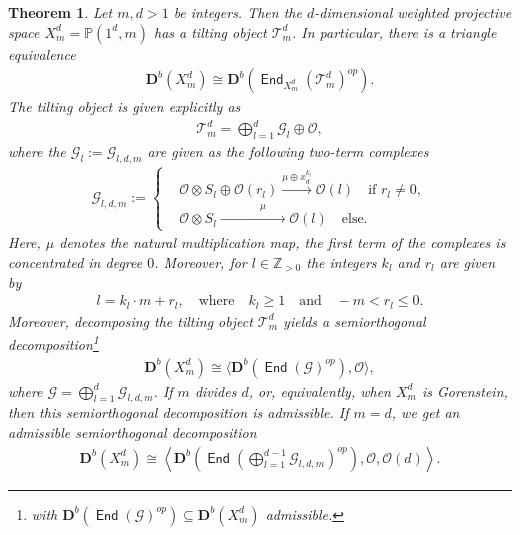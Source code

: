 \documentclass[a4paper,11pt, reqno]{amsart}
\def\P{\mathbb P}
\def\Z{\mathbb Z}
\def\DD{\mathbf D}
\def\OO{\mathcal O}
\def\sG{\mathscr{G}}
\def\sT{\mathscr{T}}
\newcommand{\opname}[1]{\operatorname{\mathsf{#1}}}
\newcommand{\End}{\opname{End}}
\newcommand{\op}{^{op}}
\def\Db{\DD^b}
\theoremstyle{plain}
\newtheorem{theorem}[dummy]{Theorem}
\theoremstyle{definition}
\numberwithin{equation}{section}
\newlength{\arrow}
\begin{document}
\begin{theorem}\label{T:MainGenerald}
Let $m, d >1$ be integers.
Then the $d$-dimensional weighted projective space $X_{m}^d =\P(1^d, m)$ 
has a tilting object $\sT_{m}^d$. In particular, there is a triangle equivalence
\begin{align}\label{eq:tiltingAppendix}
\Db(X_{m}^d ) \cong \Db ( \End_{X_m^d}(\sT_{m}^d )\op). 
\end{align}
The tilting object is given explicitly as 
\begin{align}
\sT_m^d = \bigoplus_{l=1}^d \sG_l \oplus \OO ,
\end{align}
where the $\sG_l:=\sG_{l,d,m}$ are given as the following two-term complexes
\begin{align}
\sG_{l,d,m}:=\begin{cases} &\OO \otimes S_l \oplus \OO (r_l) \xrightarrow{\displaystyle \mu \oplus x_d^{k_l}} \OO(l) \quad \text{if } r_l \neq 0,  \\ &\OO \otimes S_l  \xrightarrow{\displaystyle \qquad \qquad \mu    \qquad} \OO(l) \quad \text{else. }\end{cases}
\end{align}
Here, $\mu$ denotes the natural multiplication map, the first term of the complexes is concentrated in degree $0$. Moreover, for $l \in \Z_{>0}$ the integers $k_l$ and $r_l$ are given by
\begin{align}
l=k_l \cdot m + r_l, \quad \text{where} \quad  k_l \geq 1 \quad \text{and} \quad  -m < r_l \leq 0. 
\end{align}
Moreover, decomposing the tilting object $\sT_m^d$
yields a semiorthogonal decomposition\footnote{
{with $\Db ( \End ( \sG )\op ) \subseteq \Db ( X_m^d )$ admissible.}}
    \begin{align}\label{eq:SODwpsgeneral}
        \Db ( X_m^d ) \cong \langle \Db ( \End ( \sG )\op ) , \OO  \rangle,
    \end{align}
    where $\sG = \bigoplus_{l=1}^d \sG_{l , d , m}$.
     If $m$ divides $d$, or, equivalently, when $X_m^d$ is Gorenstein, then this semiorthogonal decomposition is admissible. If $m=d$, we get an admissible semiorthogonal decomposition 
     \begin{align}\label{eq:SODwps2}
        \Db ( X_m^d ) \cong \left\langle \Db \left( \End\left(  \bigoplus_{l=1}^{d-1} \sG_{l , d , m} \right)\op \right) , \OO, \OO(d)  \right\rangle.
    \end{align}
\end{theorem}
\end{document}
